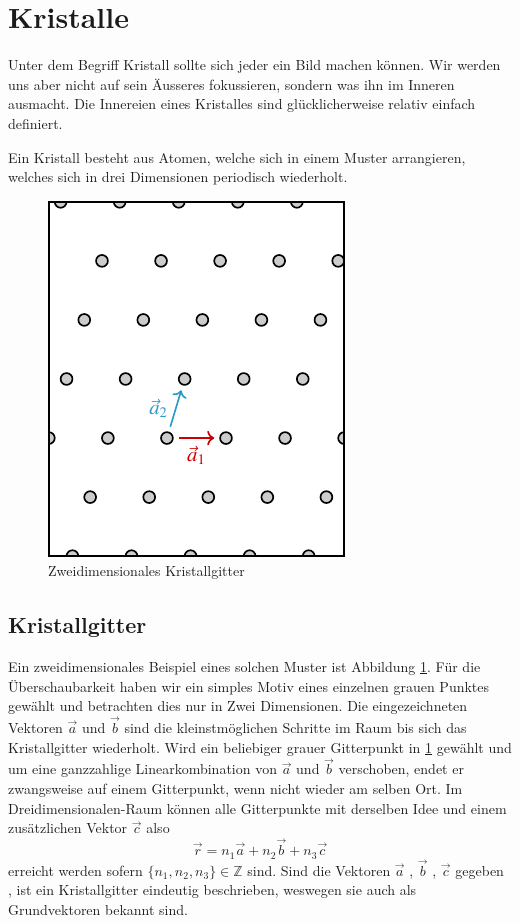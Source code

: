 \section{Kristalle}
Unter dem Begriff Kristall sollte sich jeder ein Bild machen können. 
Wir werden uns aber nicht auf sein Äusseres fokussieren, sondern was ihn im Inneren ausmacht.
Die Innereien eines Kristalles sind glücklicherweise relativ einfach definiert.
\begin{definition}[Kristall]
    Ein Kristall besteht aus Atomen, welche sich in einem Muster arrangieren, welches sich in drei Dimensionen periodisch wiederholt.
\end{definition}

\begin{figure}
    \centering
    \includegraphics[]{papers/punktgruppen/figures/lattice}
    \caption{
        Zweidimensionales Kristallgitter
        \label{fig:punktgruppen:lattice}
    }
\end{figure}
\subsection{Kristallgitter}
Ein zweidimensionales Beispiel eines solchen Muster ist Abbildung \ref{fig:punktgruppen:lattice}.
Für die Überschaubarkeit haben wir ein simples Motiv eines einzelnen grauen Punktes gewählt und betrachten dies nur in Zwei Dimensionen.
Die eingezeichneten Vektoren $\vec{a}$ und $\vec{b}$ sind die kleinstmöglichen Schritte im Raum bis sich das Kristallgitter wiederholt.
Wird ein beliebiger grauer Gitterpunkt in \ref{fig:punktgruppen:lattice} gewählt 
und um eine ganzzahlige Linearkombination von $\vec{a}$ und $\vec{b}$ verschoben, 
endet er zwangsweise auf einem Gitterpunkt, wenn nicht wieder am selben Ort.
Im Dreidimensionalen-Raum können alle Gitterpunkte mit derselben Idee und einem zusätzlichen Vektor $\vec{c}$ also 
\[
    \vec{r} = n_1 \vec{a} + n_2 \vec{b} + n_3 \vec{c}   
\]
erreicht werden sofern $\{n_1,n_2,n_3\} \in \mathbb{Z}$ sind.
Sind die Vektoren  $\vec{a}$ , $\vec{b}$ , $\vec{c}$ gegeben ,
ist ein Kristallgitter eindeutig beschrieben, weswegen sie auch als Grundvektoren bekannt sind.

